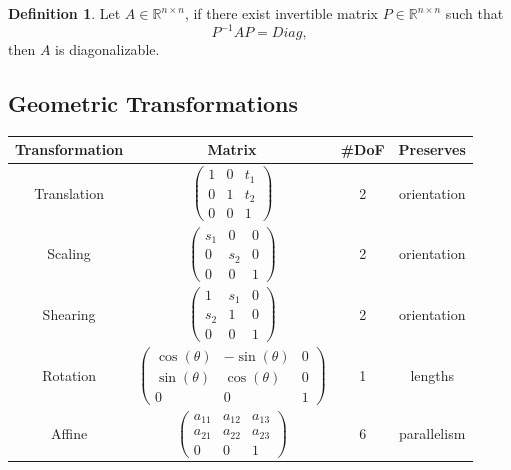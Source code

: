 \documentclass[a4paper]{article}
\theoremstyle{definition}
\newtheorem{definition}{Definition}
\theoremstyle{plain}
\begin{document}
\begin{definition}
 Let $A\in\mathbb{R}^{n\times n}$, if there exist invertible matrix $P\in\mathbb{R}^{n\times n}$ such that 
\begin{equation*}
    P^{-1}AP=Diag,
\end{equation*}
then $A$ is diagonalizable.
\end{definition}

\subsection{Geometric Transformations}
\begin{table}[H]
\centering
\begin{tabular}{cccc}
\hline
\textbf{Transformation} & \multicolumn{1}{c}{\textbf{Matrix}} & \textbf{\#DoF} & \textbf{Preserves} \\ \hline
Translation             & $\begin{pmatrix} 1 & 0 & t_1\\ 0 & 1 & t_2\\ 0 & 0 & 1\end{pmatrix}$ & 2              & orientation        \\
Scaling                 & $\begin{pmatrix} s_{1} & 0 & 0\\ 0 & s_{2} & 0\\ 0 & 0 & 1\end{pmatrix}$  & 2 & orientation\\
Shearing                 & $\begin{pmatrix} 1 & s_{1} & 0\\ s_{2} & 1 & 0\\ 0 & 0 & 1\end{pmatrix}$  & 2 & orientation\\
Rotation       & $\begin{pmatrix} \cos(\theta) & -\sin(\theta) & 0\\ \sin(\theta) & \cos(\theta) & 0\\ 0 & 0 & 1\end{pmatrix}$ & 1              & lengths            \\
Affine                  & $\begin{pmatrix} a_{11} & a_{12} & a_{13}\\ a_{21} & a_{22} & a_{23}\\ 0 & 0 & 1\end{pmatrix}$ & 6              & parallelism        \\\hline
\end{tabular}
\end{table}
\end{document}
